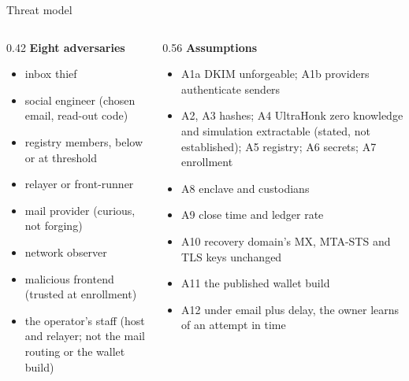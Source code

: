 \documentclass[aspectratio=169,11pt]{beamer}
\begin{document}
\begin{frame}{Threat model}
  \footnotesize
  \begin{columns}[T]
    \begin{column}{0.42\textwidth}
      \textbf{Eight adversaries}
      \begin{itemize}
        \item inbox thief
        \item social engineer (chosen email, read-out code)
        \item registry members, below or at threshold
        \item relayer or front-runner
        \item mail provider (curious, not forging)
        \item network observer
        \item malicious frontend (trusted at enrollment)
        \item the operator's staff (host and relayer; not the mail
          routing or the wallet build)
      \end{itemize}
    \end{column}
    \begin{column}{0.56\textwidth}
      \textbf{Assumptions}
      \begin{itemize}
        \item A1a DKIM unforgeable; A1b providers authenticate senders
        \item A2, A3 hashes; A4 UltraHonk zero knowledge and simulation
          extractable (stated, not established); A5 registry; A6 secrets; A7
          enrollment
        \item A8 enclave and custodians
        \item A9 close time and ledger rate
        \item A10 recovery domain's MX, MTA-STS and TLS keys unchanged
        \item A11 the published wallet build
        \item A12 under email plus delay, the owner learns of an attempt in time
      \end{itemize}
    \end{column}
  \end{columns}
\end{frame}
\end{document}
